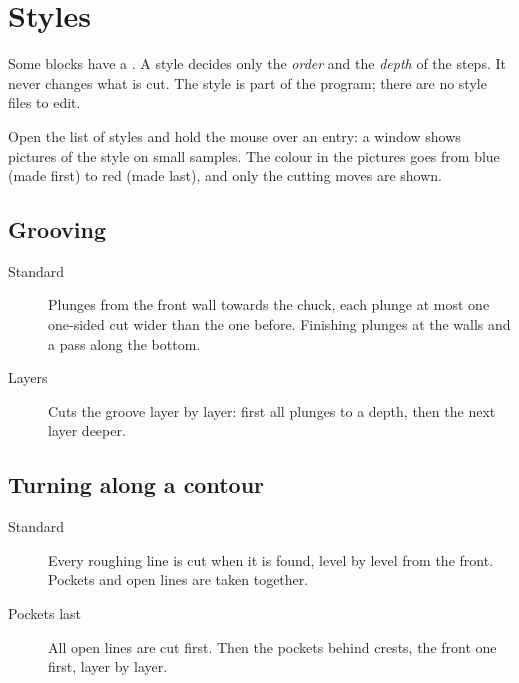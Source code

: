\section{Styles}\label{sec:blocks:styles}

Some blocks have a . A style decides only the \emph{order} and the \emph{depth} of the steps. It never changes what is cut. The style is part of the program; there are no style files to edit.

Open the list of styles and hold the mouse over an entry: a window shows pictures of the style on small samples. The colour in the pictures goes from blue (made first) to red (made last), and only the cutting moves are shown.

\subsection{Grooving}
\begin{description}
\item[Standard] Plunges from the front wall towards the chuck, each plunge at most one one-sided cut wider than the one before. Finishing plunges at the walls and a pass along the bottom.
\item[Layers] Cuts the groove layer by layer: first all plunges to a depth, then the next layer deeper.
\end{description}


\subsection{Turning along a contour}
\begin{description}
\item[Standard] Every roughing line is cut when it is found, level by level from the front. Pockets and open lines are taken together.
\item[Pockets last] All open lines are cut first. Then the pockets behind crests, the front one first, layer by layer.
\end{description}

